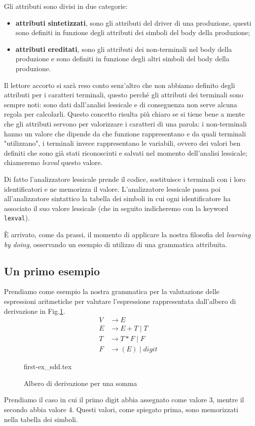 \documentclass[class=book, crop=false, oneside, 12pt]{standalone}
\begin{document}
Gli attributi sono divisi in due categorie:
\begin{itemize}
    \item \textbf{attributi sintetizzati}, sono gli attributi del driver di una produzione, questi sono definiti in funzione degli attributi dei simboli del body della produzione;
    \item \textbf{attributi ereditati}, sono gli attributi dei non-terminali nel body della produzione e sono definiti in funzione degli altri simboli del body della produzione.
\end{itemize}
Il lettore accorto si sarà reso conto senz'altro che non abbiamo definito degli attributi per i caratteri terminali, questo perché gli attributi dei terminali sono sempre noti: sono dati dall'analisi lessicale e di conseguenza non serve alcuna regola per calcolarli.
Questo concetto risulta più chiaro se si tiene bene a mente che gli attributi servono per valorizzare i caratteri di una parola: i non-terminali hanno un valore che dipende da che funzione rappresentano e da quali terminali "utilizzano", i terminali invece rappresentano le variabili, ovvero dei valori ben definiti che sono già stati riconosciuti e salvati nel momento dell'analisi lessicale; chiameremo \emph{lexval} questo valore.

Di fatto l'analizzatore lessicale prende il codice, sostituisce i terminali con i loro identificatori e ne memorizza il valore.
L'analizzatore lessicale passa poi all'analizzatore sintattico la tabella dei simboli in cui ogni identificatore ha associato il suo valore lessicale (che in seguito indicheremo con la keyword \texttt{lexval}).

È arrivato, come da prassi, il momento di applicare la nostra filosofia del \emph{learning by doing}, osservando un esempio di utilizzo di una grammatica attribuita.

\subsection{Un primo esempio}
Prendiamo come esempio la nostra grammatica per la valutazione delle espressioni aritmetiche per valutare l'espressione rappresentata dall'albero di derivazione in Fig.\ref{fig:first-ex_SDD}.
\begin{align*}
    V &\to E \\
    E &\to E + T \mid T\\
    T &\to T * F \mid F\\
    F &\to (E) \mid digit
\end{align*}
\begin{figure}[H]
    \centering
    {first-ex_sdd.tex}
    \caption{Albero di derivazione per una somma}
    \label{fig:first-ex_SDD}
\end{figure}
Prendiamo il caso in cui il primo digit abbia assegnato come valore 3, mentre il secondo abbia valore 4.
Questi valori, come spiegato prima, sono memorizzati nella tabella dei simboli.
\end{document}
